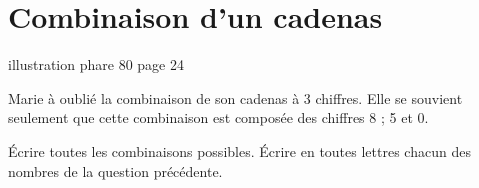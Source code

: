 \section{Combinaison d'un cadenas}

illustration phare 80 page 24

Marie à oublié la combinaison de son cadenas à 3 chiffres. Elle se souvient seulement que cette combinaison est composée des chiffres 8 ; 5 et 0.

\begin{questions}
	\question \'Ecrire toutes les combinaisons possibles.
	\question \'Ecrire en toutes lettres chacun des nombres de la question précédente.
\end{questions}